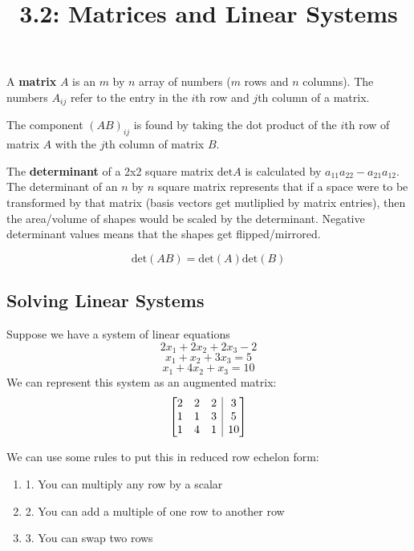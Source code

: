 \documentclass{article}
\title{3.2: Matrices and Linear Systems}
\begin{document}
\maketitle
\begin{definition}[Matrices]
A \textbf{matrix} $A$ is an $m$ by $n$ array of numbers ($m$ rows and $n$ columns). The numbers $A_{ij}$ refer to the entry in the $i$th row and $j$th column of a matrix. 
\end{definition}

\begin{definition}
The component $(AB)_{ij}$ is found by taking the dot product of the $i$th row of matrix $A$ with the $j$th column of matrix $B$. 
\end{definition}

\begin{definition}[Determinant]
The \textbf{determinant} of a 2x2 square matrix $\text{det} A$ is calculated by $a_{11}a_{22} - a_{21}a_{12}$. The determinant of an $n$ by $n$ square matrix represents that if a space were to be transformed by that matrix (basis vectors get mutliplied by matrix entries), then the area/volume of shapes would be scaled by the determinant. Negative determinant values means that the shapes get flipped/mirrored. 
\end{definition}

$$\text{det}(AB) = \text{det}(A) \text{det}(B)$$

\subsection{Solving Linear Systems}

Suppose we have a system of linear equations $$2x_1 + 2x_2 + 2x_3 - 2$$$$x_1 + x_2 + 3x_3 = 5$$$$x_1+4x_2+x_3 = 10$$We can represent this system as an augmented matrix: $$\left[\begin{array}{@{}ccc|c@{}}
    2 & 2 & 2 & 3 \\
    1 & 1 & 3 & 5 \\
    1 & 4 & 1 & 10 \\
    \end{array}\right]$$

We can use some rules to put this in reduced row echelon form:
\begin{enumerate}
    \item 1. You can multiply any row by a scalar
    \item 2. You can add a multiple of one row to another row
    \item 3. You can swap two rows
\end{enumerate}
\end{document}

